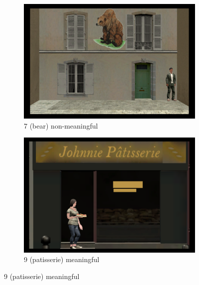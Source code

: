 \begin{figure}[!htb]
	\centering
	\begin{subfigure}[b]{0.48\linewidth}
		\includegraphics[width=\linewidth]{figures/starting_locations_appx/07_R(bear)_A.PNG}
		\caption{7 (bear) non-meaningful}
		\label{fig:07_R(bear)_A}
	\end{subfigure}
	\begin{subfigure}[b]{0.48\linewidth}
		\includegraphics[width=\linewidth]{figures/starting_locations_appx/09_S(patisserie)_A.PNG}
		\caption{9 (patisserie) meaningful}
		\label{fig:09_S(patisserie)_A}
	\end{subfigure}


\end{figure}
